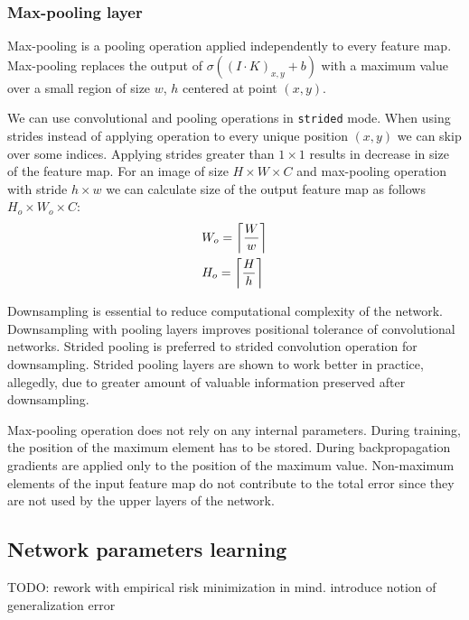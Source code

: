 \subsubsection{Max-pooling layer}

Max-pooling is a pooling operation applied independently to every feature map.
Max-pooling replaces the output of $\sigma((I \cdot K)_{x, y}+b)$ with a maximum value over a small region of size $w$, $h$ centered at point $(x,y)$.

We can use convolutional and pooling operations in \texttt{strided} mode. When using strides instead of applying operation to every unique position $(x, y)$ we can skip over some indices. Applying strides greater than $1 \times 1$ results in decrease in size of the feature map. For an image of size $H \times W \times C$ and max-pooling operation with stride $h \times w$ we can calculate size of the output feature map as follows $H_o \times W_o \times C $:
\begin{equation*}
  \begin{aligned}
  & W_o = \ceil[\bigg]{\frac{W}{w}} \\
  & H_o = \ceil[\bigg]{\frac{H}{h}} \\
\end{aligned}
\end{equation*}

Downsampling is essential to reduce computational complexity of the network.
Downsampling with pooling layers improves positional tolerance of convolutional networks.
Strided pooling is preferred to strided convolution operation for downsampling. Strided pooling layers are shown to work better in practice, allegedly, due to greater amount of valuable information preserved after downsampling.

Max-pooling operation does not rely on any internal parameters. During training, the position of the maximum element has to be stored. During backpropagation gradients are applied only to the position of the maximum value. Non-maximum elements of the input feature map do not contribute to the total error since they are not used by the upper layers of the network.

\subsection{Network parameters learning}
\label{ch:opt}

TODO: rework with empirical risk minimization in mind. introduce notion of generalization error

